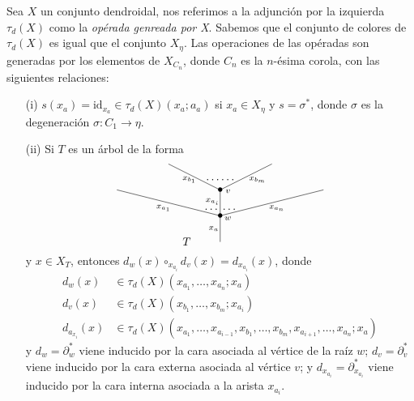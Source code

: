 \documentclass[11pt,a4paper,openright,oneside]{article}
\numberwithin{equation}{section}
\theoremstyle{definition}
\begin{document}
Sea $X$ un conjunto dendroidal, nos referimos a la adjunci\'on por la izquierda $\tau_d(X)$ como la \emph{op\'erada genreada por X}.
Sabemos que el conjunto de colores de $\tau_d(X)$ es igual que el conjunto $X_\eta$. Las operaciones de las op\'eradas son generadas por los elementos de $X_{C_n}$, donde $C_n$ es la $n$-\'esima corola, con las siguientes relaciones:
\begin{enumerate}
    \item[{\rm (i)}] $s(x_a) = \text{id}_{x_a} \in \tau_d(X)(x_a;a_a)$ si $x_a\in X_\eta$ y $s=\sigma^{*}$, donde $\sigma$ es la degeneraci\'on $\sigma\colon C_1 \to\eta$.
    \item[{\rm (ii)}] Si $T$ es un \'arbol de la forma
          \begin{equation}
              \xy
              <0.08cm, 0cm>:
              (0.0, 0.0)*{}="1"; %
              (0.0, 10.0)*=0{\bullet}="2"; %
              (-40.0, 20.0)*{}="3"; %
              (0.0, 20.0)*=0{\bullet}="4"; %
              (-20.0, 30.0)*{}="5"; %
              (20.0, 30.0)*{}="6"; %
              (40.0, 20.0)*{}="7"; %
              "1";"2" **\dir{-};
              "2";"3" **\dir{-};
              "2";"4" **\dir{-};
              "4";"5" **\dir{-};
              "4";"6" **\dir{-};
              "2";"7" **\dir{-};
              (3.0, 9.0)*=0{\scriptstyle w};
              (3.0, 19.5)*=0{\scriptstyle v};
              (-2.5, 5.0)*=0{\scriptstyle x_a};
              (-22.0, 13.0)*=0{\scriptstyle x_{a_1}};
              (-3.0, 15.5)*=0{\scriptstyle x_{a_i}};
              (-12.0, 24.0)*=0{\scriptstyle x_{b_1}};
              (14.5, 24.0)*=0{\scriptstyle x_{b_m}};
              (22.0, 13.0)*=0{\scriptstyle x_{a_n}};
              (0,24)*{\dots\dots};
              (-3.5,12.5)*{\dots};
              (3.5,12.5)*{\dots};
              (-13,0)*{T};
              \endxy
          \end{equation}
          y $x\in X_T$, entonces $d_w(x)\circ_{x_{a_i}}d_v(x)=d_{x_{a_i}}(x)$, donde
          \begin{align*}
              d_w(x)         & \in \tau_d(X)(x_{a_1},\dots,x_{a_n};x_a)                                                     \\
              d_v(x)         & \in \tau_d(X)(x_{b_1},\dots,x_{b_m};x_{a_i})                                                 \\
              d_{a_{x_i}}(x) & \in \tau_d(X)(x_{a_1},\dots,x_{a_{i-1}},x_{b_1},\dots,x_{b_m},x_{a_{i+1}},\dots,x_{a_n};x_a)
          \end{align*}
          y $d_w = \partial_w^{*}$ viene inducido por la cara asociada al v\'ertice de la ra\'iz $w$; $d_v = \partial_v^{*}$ viene inducido por la cara externa asociada al v\'ertice $v$; y $d_{x_{a_i}}= \partial_{x_{a_i}}^{*}$ viene inducido por la cara interna asociada a la arista $x_{a_i}$.
\end{enumerate}
\end{document}
